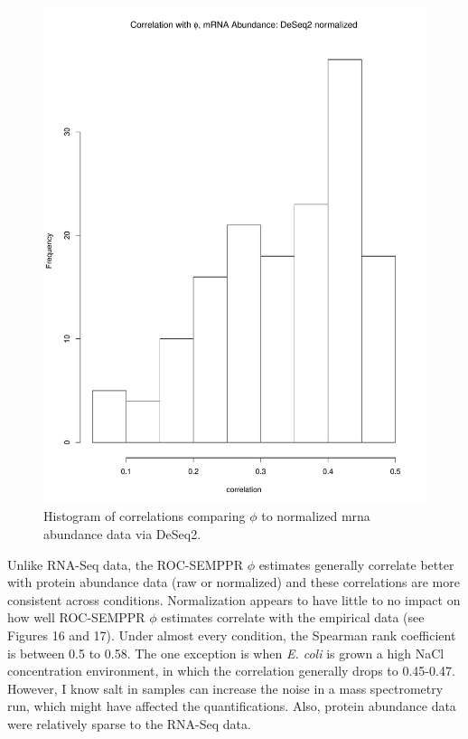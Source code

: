 \documentclass[11pt]{labbook}
\begin{document}
\begin{figure}[H]
\centering
\includegraphics[page=1,scale=0.6]{Ecoli_REL606/correlation_ppr_mrna_sf_norm.pdf}
\caption{Histogram of correlations comparing $\phi$ to normalized mrna abundance data via DeSeq2.}
\end{figure}

Unlike RNA-Seq data, the ROC-SEMPPR $\phi$ estimates generally correlate better with protein abundance data (raw or normalized) and these correlations are more consistent across conditions. Normalization appears to have little to no impact on how well ROC-SEMPPR $\phi$ estimates correlate with the empirical data (see Figures 16 and 17). Under almost every condition, the Spearman rank coefficient is between 0.5 to 0.58. The one exception is when \textit{E. coli} is grown a high NaCl concentration environment, in which the correlation generally drops to 0.45-0.47. However, I know salt in samples can increase the noise in a mass spectrometry run, which might have affected the quantifications. Also, protein abundance data were relatively sparse to the RNA-Seq data.   
\end{document}
